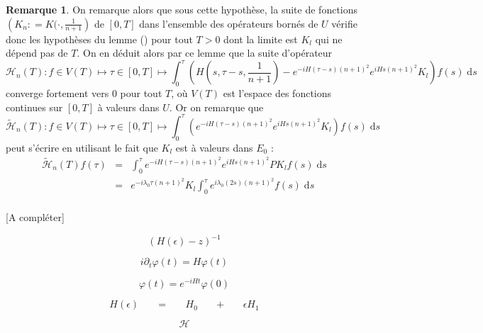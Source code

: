 \documentclass[12pt,openany,a4paper, titlepage]{article}
\newcommand{\f}[2]{\frac{#1}{#2}}
\newcommand{\lp}{\left(}
\newcommand{\rp}{\right)}
\newcommand{\dd}{\;\mathrm{d}}
\newcommand{\vp}{\varphi}
\newcommand{\St}[2]{e^{-i #1 #2}}
\newcommand{\Stt}[2]{e^{i #1 #2}}
\theoremstyle{definition}
\theoremstyle{definition}
\theoremstyle{definition}
\theoremstyle{definition}
\theoremstyle{definition}
\newtheorem{rem}{Remarque}
\theoremstyle{definition}
\begin{document}
\begin{rem}
On remarque alors que sous cette hypothèse, la suite de fonctions $\lp K_n : = K(\cdot,\f{1}{n+1}\rp$ de $[0,T]$ dans l'ensemble des opérateurs bornés de $U$ vérifie donc les hypothèses du lemme () pour tout $T>0$ dont la limite est $K_l$ qui ne dépend pas de $T$. On en déduit alors par ce lemme que la suite d'opérateur
\begin{equation}
    \mathcal{H}_n(T) : f\in V(T) \mapsto \tau\in[0,T] \mapsto \int_0^\tau \lp H(s,\tau - s, \f{1}{n+1}) - \St{H}{(\tau-s)(n+1)^2}\Stt{H}{s(n+1)^2} K_l \rp f(s) \dd s 
\end{equation}
converge fortement vers $0$ pour tout $T$, où $V(T)$ est l'espace des fonctions continues sur $[0,T]$ à valeurs dans $U$. Or on remarque que
\begin{equation}
    \tilde{\mathcal{H}}_n(T) : f\in V(T) \mapsto \tau\in[0,T] \mapsto \int_0^\tau \lp \St{H}{(\tau-s)(n+1)^2}\Stt{H}{s(n+1)^2} K_l \rp f(s) \dd s
\end{equation}
peut s'écrire en utilisant le fait que $K_l$ est à valeurs dans $E_0$ :
\begin{eqnarray}
    \tilde{\mathcal{H}}_n(T)f(\tau) &=& \int_0^\tau \St{H}{(\tau-s)(n+1)^2}\Stt{H}{s(n+1)^2} P K_l f(s)\dd s \\
                                    &=& \St{\lambda_0}{\tau(n+1)^2}K_l \int_0^\tau \Stt{\lambda_0}{(2s)(n+1)^2} f(s) \dd s \\
\end{eqnarray}

[A compléter]

\newpage
\printbibliography

\newpage

\begin{equation}
    \lp H(\epsilon) - z \rp^{-1}
\end{equation}

\begin{equation}
    i\partial_t \vp(t) = H\vp(t)
\end{equation}


\begin{equation}
    \vp(t) = e^{-iHt}\vp(0)
\end{equation}

\begin{equation}
    H(\epsilon) \;\;\;\;\;\; = \;\;\;\;\;\; H_0 \;\;\;\;\;\; + \;\;\;\;\;\;  \epsilon H_1
\end{equation}

\begin{equation}
    \mathcal{H}
\end{equation}


\end{rem}
\end{document}
